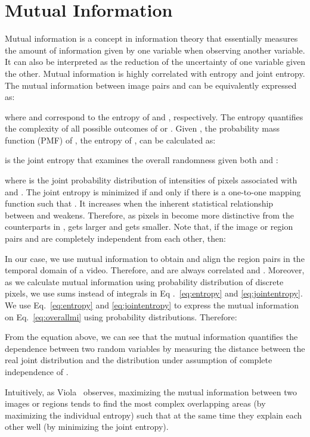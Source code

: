 \documentclass[10pt,twocolumn,letterpaper]{article}
\begin{document}
{ \section{Mutual Information}\label{sec:mi}
Mutual information is a concept in information theory that essentially measures the amount of information given by one variable when observing another variable. It can also be interpreted as the reduction of the uncertainty of one variable given the other. Mutual information is highly correlated with entropy and joint entropy. The mutual information between image pairs  and  can be equivalently expressed as:

where  and  correspond to the entropy of  and , respectively. The entropy quantifies the complexity of all possible outcomes of  or . Given ,  the probability mass function (PMF) of , the entropy of ,  can be calculated as:

 is the joint entropy that examines the overall randomness given both  and :

where  is the joint probability distribution of intensities of pixels associated with  and . The joint entropy  is minimized if and only if there is a one-to-one mapping function  such that . It increases when the inherent statistical relationship between  and  weakens. Therefore, as pixels in  become more distinctive from the counterparts in ,  gets larger and  gets smaller.
Note that, if the image or region pairs  and  are completely independent from each other, then:

In our case, we use mutual information to obtain and align the region pairs in the temporal domain of a video. Therefore,  and  are always correlated and . Moreover, as we calculate mutual information using probability distribution of discrete pixels, we use sums instead of integrals in Eq .~\ref{eq:entropy} and \ref{eq:jointentropy}.
We use Eq.~\ref{eq:entropy} and \ref{eq:jointentropy} to express the mutual information on Eq.~\ref{eq:overallmi} using probability distributions. Therefore:

From the equation above, we can see that the mutual information quantifies the dependence between two random variables by measuring the distance between the real joint distribution  and the distribution under assumption of complete independence of .

Intuitively, as Viola~\cite{Viola1995AlignmentBM} observes, maximizing the mutual information between two images or regions tends to find the most complex overlapping areas (by maximizing the individual entropy) such that at the same time they explain each other well (by minimizing the joint entropy). 


}
\end{document}
